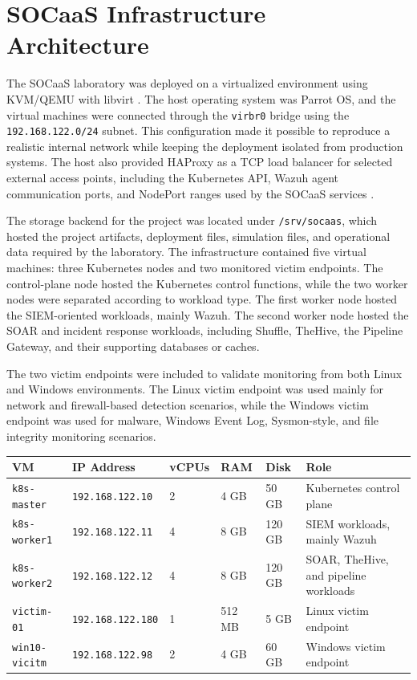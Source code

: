 \section{SOCaaS Infrastructure Architecture}
\label{sec:ch4-socaas-infrastructure-architecture}

The SOCaaS laboratory was deployed on a virtualized environment using KVM/QEMU with libvirt \cite{ch4-kvm-docs,ch4-qemu-docs,ch4-libvirt-docs}. The host operating system was Parrot OS, and the virtual machines were connected through the \texttt{virbr0} bridge using the \texttt{192.168.122.0/24} subnet. This configuration made it possible to reproduce a realistic internal network while keeping the deployment isolated from production systems. The host also provided HAProxy as a TCP load balancer for selected external access points, including the Kubernetes API, Wazuh agent communication ports, and NodePort ranges used by the SOCaaS services \cite{ch4-haproxy-docs,ch4-kubernetes-services}.

The storage backend for the project was located under \texttt{/srv/socaas}, which hosted the project artifacts, deployment files, simulation files, and operational data required by the laboratory. The infrastructure contained five virtual machines: three Kubernetes nodes and two monitored victim endpoints. The control-plane node hosted the Kubernetes control functions, while the two worker nodes were separated according to workload type. The first worker node hosted the SIEM-oriented workloads, mainly Wazuh. The second worker node hosted the SOAR and incident response workloads, including Shuffle, TheHive, the Pipeline Gateway, and their supporting databases or caches.

The two victim endpoints were included to validate monitoring from both Linux and Windows environments. The Linux victim endpoint was used mainly for network and firewall-based detection scenarios, while the Windows victim endpoint was used for malware, Windows Event Log, Sysmon-style, and file integrity monitoring scenarios.

\begin{table}[H]
\centering
\small
\renewcommand{\arraystretch}{1.25}
\begin{tabularx}{\textwidth}{|X|X|X|X|X|X|}
\hline
\textbf{VM} & \textbf{IP Address} & \textbf{vCPUs} & \textbf{RAM} & \textbf{Disk} & \textbf{Role} \\
\hline
\texttt{k8s-master} & \texttt{192.168.122.10} & 2 & 4 GB & 50 GB & Kubernetes control plane \\
\hline
\texttt{k8s-worker1} & \texttt{192.168.122.11} & 4 & 8 GB & 120 GB & SIEM workloads, mainly Wazuh \\
\hline
\texttt{k8s-worker2} & \texttt{192.168.122.12} & 4 & 8 GB & 120 GB & SOAR, TheHive, and pipeline workloads \\
\hline
\texttt{victim-01} & \texttt{192.168.122.180} & 1 & 512 MB & 5 GB & Linux victim endpoint \\
\hline
\texttt{win10-vicitm} & \texttt{192.168.122.98} & 2 & 4 GB & 60 GB & Windows victim endpoint \\
\hline
\end{tabularx}
\end{table}

